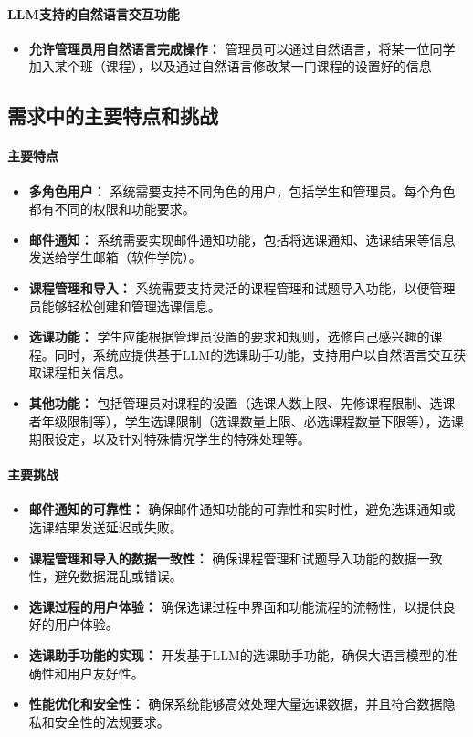 \documentclass{article}
\begin{document}
\paragraph{LLM支持的自然语言交互功能}
\begin{itemize}
	\item \textbf{允许管理员用自然语言完成操作：} 管理员可以通过自然语言，将某一位同学加入某个班（课程），以及通过自然语言修改某一门课程的设置好的信息
\end{itemize}


\subsection{需求中的主要特点和挑战}
\paragraph{主要特点}
\begin{itemize}
	\item \textbf{多角色用户：} 系统需要支持不同角色的用户，包括学生和管理员。每个角色都有不同的权限和功能要求。
	\item \textbf{邮件通知：} 系统需要实现邮件通知功能，包括将选课通知、选课结果等信息发送给学生邮箱（软件学院）。
	\item \textbf{课程管理和导入：} 系统需要支持灵活的课程管理和试题导入功能，以便管理员能够轻松创建和管理选课信息。
	\item \textbf{选课功能：} 学生应能根据管理员设置的要求和规则，选修自己感兴趣的课程。同时，系统应提供基于LLM的选课助手功能，支持用户以自然语言交互获取课程相关信息。
	\item \textbf{其他功能：} 包括管理员对课程的设置（选课人数上限、先修课程限制、选课者年级限制等），学生选课限制（选课数量上限、必选课程数量下限等），选课期限设定，以及针对特殊情况学生的特殊处理等。
\end{itemize}

\paragraph{主要挑战}
\begin{itemize}
	\item \textbf{邮件通知的可靠性：}  确保邮件通知功能的可靠性和实时性，避免选课通知或选课结果发送延迟或失败。
	\item \textbf{课程管理和导入的数据一致性：} 确保课程管理和试题导入功能的数据一致性，避免数据混乱或错误。
	\item \textbf{选课过程的用户体验：} 确保选课过程中界面和功能流程的流畅性，以提供良好的用户体验。
	\item \textbf{选课助手功能的实现：} 开发基于LLM的选课助手功能，确保大语言模型的准确性和用户友好性。
	\item \textbf{性能优化和安全性：} 确保系统能够高效处理大量选课数据，并且符合数据隐私和安全性的法规要求。
\end{itemize}
\end{document}
